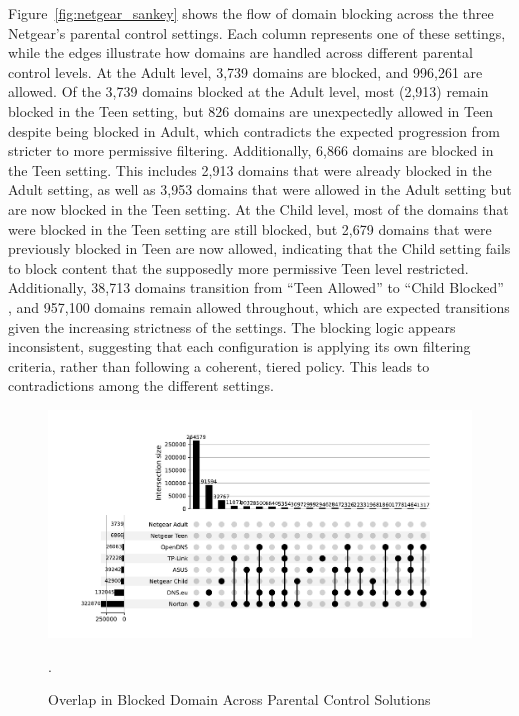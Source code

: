 Figure~\ref{fig:netgear_sankey} shows the flow of domain blocking across the three Netgear’s parental control settings. 
Each column represents one of these settings, while the edges illustrate how domains are handled across different parental control levels.
At the Adult level, 3,739 domains are blocked, and 996,261 are allowed. Of the 3,739 domains blocked at the Adult level, most (2,913) remain blocked in the Teen setting, but 826 domains are unexpectedly allowed in Teen despite being blocked in Adult, which contradicts the expected progression from stricter to more permissive filtering.
Additionally, 6,866 domains are blocked in the Teen setting. This includes 2,913 domains that were already blocked in the Adult setting, as well as 3,953 domains that were allowed in the Adult setting but are now blocked in the Teen setting.
At the Child level, most of the domains that were blocked in the Teen setting are still blocked, but 2,679 domains that were previously blocked in Teen are now allowed, indicating that the Child setting fails to block content that the supposedly more permissive Teen level restricted.
Additionally, 38,713 domains transition from ``Teen Allowed''  to ``Child Blocked'' , and 957,100 domains remain allowed throughout, which are expected transitions given the increasing strictness of the settings.
The blocking logic appears inconsistent, suggesting that each configuration is applying its own filtering criteria, rather than following a coherent, tiered policy. This leads to contradictions among the different settings.

\begin{figure}[htbp]
    \centering
    \includegraphics[width=0.95\columnwidth]{Images/Results/upset_blocked_domains_over300.pdf}
    \caption{Overlap in Blocked Domain Across Parental Control Solutions}.
    \label{fig:upset_plot}
\end{figure}

